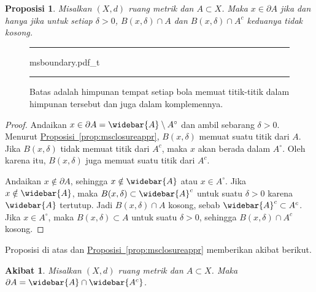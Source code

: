 \documentclass[12pt,openany]{book}
\theoremstyle{plain}
\newtheorem{prop}[thm]{Proposisi}
\newtheorem{cor}[thm]{Akibat}
\theoremstyle{remark}
\theoremstyle{definition}
\newenvironment{myfig}{%
\begin{figure}[h!t]
\noindent\rule{\textwidth}{0.5pt}\vspace{12pt}\par\centering}%
{\par\noindent\rule{\textwidth}{0.5pt}
\end{figure}}
\theoremstyle{exercise}
\theoremstyle{example}
\newcommand{\propref}[1]{\hyperref[#1]{Proposisi~\ref*{#1}}}
\begin{document}
\begin{prop}
Misalkan $(X,d)$ ruang metrik dan $A \subset X$. Maka $x \in \partial A$
jika dan hanya jika untuk setiap $\delta > 0$,
$B(x,\delta) \cap A$ dan
$B(x,\delta) \cap A^c$ keduanya tidak kosong.
\end{prop}

\begin{myfig}
{msboundary.pdf_t}
\caption{Batas adalah himpunan tempat setiap bola memuat titik-titik dalam himpunan tersebut dan
juga dalam komplemennya.\label{fig:msboundary}}
\end{myfig}

\begin{proof}
Andaikan $x \in \partial A =  \widebar{A} \setminus A^\circ$ dan
ambil sebarang $\delta > 0$.
Menurut \propref{prop:msclosureappr}, $B(x,\delta)$ memuat
suatu titik dari $A$. Jika $B(x,\delta)$ tidak memuat titik dari $A^c$,
maka $x$ akan berada dalam $A^\circ$. Oleh karena itu, $B(x,\delta)$ juga memuat suatu titik dari
$A^c$.

Andaikan $x \notin \partial A$, sehingga $x \notin \widebar{A}$ atau $x \in A^\circ$.
Jika $x \notin \widebar{A}$, maka
$B(x,\delta) \subset \widebar{A}^c$
untuk suatu $\delta > 0$ karena $\widebar{A}$ tertutup.
Jadi $B(x,\delta) \cap A$ kosong, sebab $\widebar{A}^c \subset
A^c$.
Jika $x \in A^\circ$, maka
$B(x,\delta) \subset A$ untuk suatu $\delta > 0$,
sehingga $B(x,\delta) \cap A^c$ kosong.
\end{proof}

Proposisi di atas dan \propref{prop:msclosureappr} memberikan akibat berikut.

\begin{cor}
Misalkan $(X,d)$ ruang metrik dan $A \subset X$.
Maka $\partial A = \widebar{A} \cap \widebar{A^c}$.
\end{cor}
\end{document}
